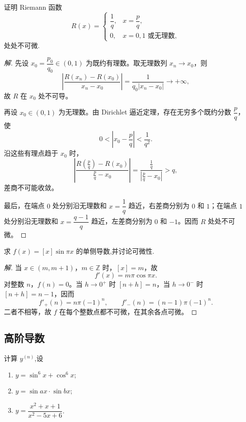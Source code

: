 \documentclass[../../数学分析培优讲义(答案版).tex]{subfiles}
\begin{document}
\begin{example}[\markstar]
证明 Riemann 函数
\[
R(x)=
\begin{cases}
    \dfrac{1}{q}, & x=\dfrac{p}{q},\\
    0, & x=0,1\text{ 或无理数},
\end{cases}
\]
处处不可微.
\end{example}

\begin{proof}[解]
先设 $x_0=\dfrac{p_0}{q_0}\in(0,1)$ 为既约有理数。取无理数列 $x_n\to x_0$，则
\[
    \left|\dfrac{R(x_n)-R(x_0)}{x_n-x_0}\right|
    =\dfrac{1}{q_0|x_n-x_0|}\longrightarrow+\infty,
\]
故 $R$ 在 $x_0$ 处不可导。

再设 $x_0\in(0,1)$ 为无理数。由 Dirichlet 逼近定理，存在无穷多个既约分数 $\dfrac{p}{q}$，使
\[
    0<\left|x_0-\dfrac{p}{q}\right|<\dfrac{1}{q^2}.
\]
沿这些有理点趋于 $x_0$ 时，
\[
    \left|\dfrac{R\left(\frac{p}{q}\right)-R(x_0)}
    {\frac{p}{q}-x_0}\right|
    =\dfrac{\frac{1}{q}}{\left|\frac{p}{q}-x_0\right|}>q,
\]
差商不可能收敛。

最后，在端点 $0$ 处分别沿无理数和 $x=\dfrac{1}{q}$ 趋近，右差商分别为 $0$ 和 $1$；在端点 $1$ 处分别沿无理数和 $x=\dfrac{q-1}{q}$ 趋近，左差商分别为 $0$ 和 $-1$。因而 $R$ 处处不可微。
\end{proof}

\begin{example}
求 $f(x)=[x]\sin\pi x$ 的单侧导数,并讨论可微性.
\end{example}

\begin{proof}[解]
当 $x\in(m,m+1)$，$m\in\mathbb{Z}$ 时，$[x]=m$，故
\[
    f'(x)=m\pi\cos\pi x.
\]
对整数 $n$，$f(n)=0$。当 $h\to0^+$ 时 $[n+h]=n$，当 $h\to0^-$ 时 $[n+h]=n-1$，因而
\[
    f'_+(n)=n\pi(-1)^n,
    \qquad
    f'_-(n)=(n-1)\pi(-1)^n.
\]
二者不相等，故 $f$ 在每个整数点都不可微，在其余各点可微。
\end{proof}

\subsection{高阶导数}


\begin{example}
计算 $y^{(n)}$,设
\begin{enumerate}[label=(\arabic*)]
    \item $y=\sin^6x+\cos^6x$;
    \item $y=\sin ax\cdot\sin bx$;
    \item $y=\dfrac{x^2+x+1}{x^2-5x+6}$.
\end{enumerate}
\end{example}
\end{document}
